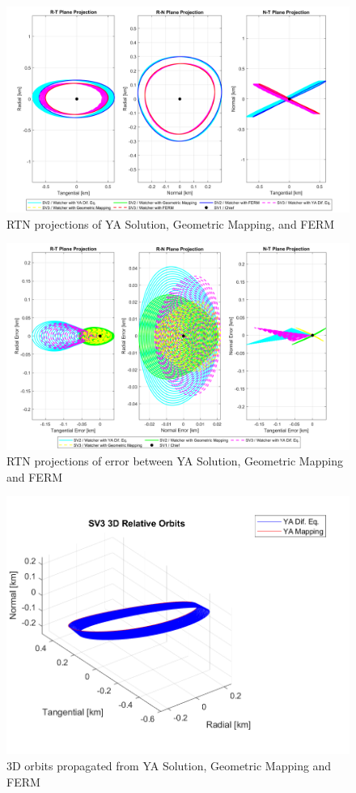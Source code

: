 \begin{figure}[H]
    \centering
    \includegraphics[width=0.7\linewidth]{sim/figures/PS3/RTN_projections_YA_comparison.png}
    \caption{RTN projections of YA Solution, Geometric Mapping, and FERM}
    \label{fig:RTN_YA_comp}
\end{figure}
\begin{figure}[H]
    \centering
    \includegraphics[width=0.7\linewidth]{sim/figures/PS3/RTN_error_projections_YA_comparison.png}
    \caption{RTN projections of error between YA Solution, Geometric Mapping and FERM}
    \label{fig:RTN_error_comp}
\end{figure}
\begin{figure}[H]
    \centering
    \includegraphics[width=0.7\linewidth]{sim/figures/PS3/3D_YA_comparison.png}
    \caption{3D orbits propagated from YA Solution, Geometric Mapping and FERM}
    \label{fig:3D_orbits_comp}
\end{figure}


